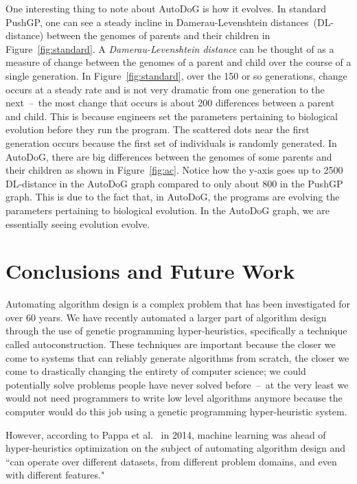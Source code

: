 \documentclass{sig-alternate}
\begin{document}
One interesting thing to note about AutoDoG is how it evolves. In standard PushGP, one can see a steady incline in Damerau-Levenshtein distances~(DL-distance) between the genomes of parents and their children in Figure~\ref{fig:standard}. A \textit{Damerau-Levenshtein distance} can be thought of as a measure of change between the genomes of a parent and child over the course of a single generation. In Figure~\ref{fig:standard}, over the 150 or so generations, change occurs at a steady rate and is not very dramatic from one generation to the next~--~the most change that occurs is about 200 differences between a parent and child. This is because engineers set the parameters pertaining to biological evolution before they run the program. The scattered dots near the first generation occurs because the first set of individuals is randomly generated. In AutoDoG, there are big differences between the genomes of some parents and their children as shown in Figure~\ref{fig:ac}. Notice how the y-axis goes up to 2500 DL-distance in the AutoDoG graph compared to only about 800 in the PushGP graph. This is due to the fact that, in AutoDoG, the programs are evolving the parameters pertaining to biological evolution. In the AutoDoG graph, we are essentially seeing evolution evolve.

\section{Conclusions and Future Work}
\label{sec:conclusion}
Automating algorithm design is a complex problem that has been investigated for over 60 years. We have recently automated a larger part of algorithm design through the use of genetic programming hyper-heuristics, specifically a technique called autoconstruction. These techniques are important because the closer we come to systems that can reliably generate algorithms from scratch, the closer we come to drastically changing the entirety of computer science; we could potentially solve problems people have never solved before~--~at the very least we would not need programmers to write low level algorithms anymore because the computer would do this job using a genetic programming hyper-heuristic system.

However, according to Pappa et al.~\cite{pappa:2014} in 2014, machine learning was ahead of hyper-heuristics optimization on the subject of automating algorithm design and ``can operate over different datasets, from different problem domains, and even with different features."
\end{document}
